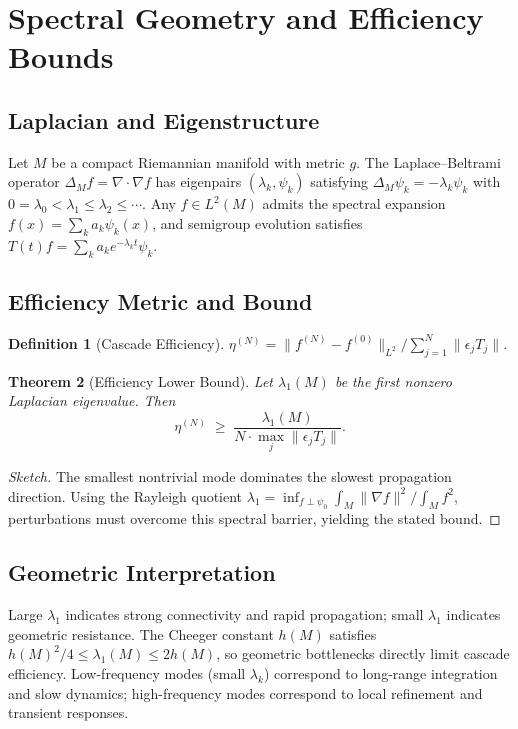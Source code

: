 \documentclass[12pt, a4paper]{article}
\newtheorem{theorem}{Theorem}[section]
\newtheorem{definition}[theorem]{Definition}
\theoremstyle{remark}
\theoremstyle{definition}
\begin{document}
\section{Spectral Geometry and Efficiency Bounds}
\label{app:spectral}

\subsection{Laplacian and Eigenstructure}

Let $M$ be a compact Riemannian manifold with metric $g$.  The Laplace--Beltrami operator
$\Delta_M f = \nabla \cdot \nabla f$ has eigenpairs $(\lambda_k, \psi_k)$ satisfying
$\Delta_M \psi_k = -\lambda_k \psi_k$ with $0 = \lambda_0 < \lambda_1 \le \lambda_2 \le
\cdots$.  Any $f \in L^2(M)$ admits the spectral expansion $f(x) = \sum_k a_k \psi_k(x)$,
and semigroup evolution satisfies $T(t)f = \sum_k a_k e^{-\lambda_k t}\psi_k$.

\subsection{Efficiency Metric and Bound}

\begin{definition}[Cascade Efficiency]
$\eta^{(N)} = \|f^{(N)} - f^{(0)}\|_{L^2} \big/ \sum_{j=1}^N \|\epsilon_j T_j\|$.
\end{definition}

\begin{theorem}[Efficiency Lower Bound]
\label{thm:efficiency}
Let $\lambda_1(M)$ be the first nonzero Laplacian eigenvalue.  Then
\[
\eta^{(N)} \;\ge\;
\frac{\lambda_1(M)}{N\cdot\max_j\|\epsilon_j T_j\|}.
\]
\end{theorem}

\begin{proof}[Sketch]
The smallest nontrivial mode dominates the slowest propagation direction.  Using the
Rayleigh quotient $\lambda_1 = \inf_{f \perp \psi_0} \int_M \|\nabla f\|^2 / \int_M f^2$,
perturbations must overcome this spectral barrier, yielding the stated bound.
\end{proof}

\subsection{Geometric Interpretation}

Large $\lambda_1$ indicates strong connectivity and rapid propagation; small $\lambda_1$
indicates geometric resistance.  The Cheeger constant $h(M)$ satisfies
$h(M)^2/4 \le \lambda_1(M) \le 2h(M)$, so geometric bottlenecks directly limit cascade
efficiency.  Low-frequency modes (small $\lambda_k$) correspond to long-range integration
and slow dynamics; high-frequency modes correspond to local refinement and transient
responses.
\end{document}
